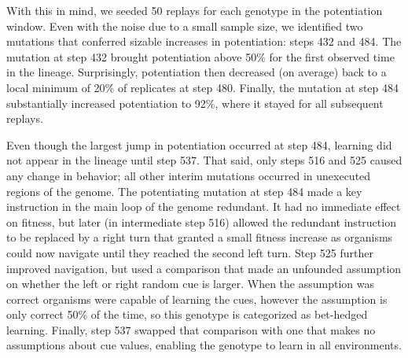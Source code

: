 With this in mind, we seeded 50 replays for each genotype in the potentiation window. 
Even with the noise due to a small sample size, %
we identified two mutations that conferred sizable increases in potentiation: steps 432 and 484.
The mutation at step 432 brought potentiation above 50\% for the first observed time in the lineage. 
Surprisingly, potentiation then decreased (on average) back to a local minimum of 20\% of replicates at step 480. 
Finally, the mutation at step 484 substantially increased potentiation to 92\%, where it stayed for all subsequent replays. 

Even though the largest jump in potentiation occurred at step 484, learning did not appear in the lineage until step 537. 
That said, only steps 516 and 525 caused any change in behavior; all other interim mutations occurred in unexecuted regions of the genome. 
The potentiating mutation at step 484 made a key instruction in the main loop of the genome redundant.
It had no immediate effect on fitness, but later (in intermediate step 516) allowed the redundant instruction to be replaced by
a right turn that granted a small fitness increase as organisms could now navigate until they reached the second left turn. 
Step 525 further improved navigation, but used a comparison that made an unfounded assumption on whether the left or right random cue is larger. 
When the assumption was correct organisms were capable of learning the cues, however the assumption is only correct 50\% of the time, so this genotype is categorized as bet-hedged learning. 
Finally, step 537 swapped that comparison with one that makes no assumptions about cue values, enabling the genotype to learn in all environments. %

